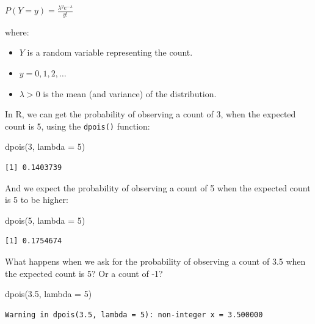 \documentclass[
  letterpaper,
  8pt,
  a4paper]{book}
\newenvironment{Shaded}{\begin{snugshade}}{\end{snugshade}}
\newcommand{\AttributeTok}[1]{\textcolor[rgb]{0.40,0.45,0.13}{#1}}
\newcommand{\DecValTok}[1]{\textcolor[rgb]{0.68,0.00,0.00}{#1}}
\newcommand{\FloatTok}[1]{\textcolor[rgb]{0.68,0.00,0.00}{#1}}
\newcommand{\FunctionTok}[1]{\textcolor[rgb]{0.28,0.35,0.67}{#1}}
\newcommand{\NormalTok}[1]{\textcolor[rgb]{0.00,0.23,0.31}{#1}}
\providecommand{\tightlist}{%
  \setlength{\itemsep}{0pt}\setlength{\parskip}{0pt}}
\begin{document}
\(P(Y = y) = \frac{\lambda^y e^{-\lambda}}{y!}\)

where:

\begin{itemize}
\tightlist
\item
  \(Y\) is a random variable representing the count.
\item
  \(y = 0, 1, 2, \ldots\)
\item
  \(\lambda > 0\) is the mean (and variance) of the distribution.
\end{itemize}

In R, we can get the probability of observing a count of 3, when the
expected count is 5, using the \texttt{dpois()} function:

\begin{Shaded}
\begin{Highlighting}[]
\FunctionTok{dpois}\NormalTok{(}\DecValTok{3}\NormalTok{, }\AttributeTok{lambda =} \DecValTok{5}\NormalTok{)}
\end{Highlighting}
\end{Shaded}

\begin{verbatim}
[1] 0.1403739
\end{verbatim}

And we expect the probability of observing a count of 5 when the
expected count is 5 to be higher:

\begin{Shaded}
\begin{Highlighting}[]
\FunctionTok{dpois}\NormalTok{(}\DecValTok{5}\NormalTok{, }\AttributeTok{lambda =} \DecValTok{5}\NormalTok{)}
\end{Highlighting}
\end{Shaded}

\begin{verbatim}
[1] 0.1754674
\end{verbatim}

What happens when we ask for the probability of observing a count of 3.5
when the expected count is 5? Or a count of -1?

\begin{Shaded}
\begin{Highlighting}[]
\FunctionTok{dpois}\NormalTok{(}\FloatTok{3.5}\NormalTok{, }\AttributeTok{lambda =} \DecValTok{5}\NormalTok{)}
\end{Highlighting}
\end{Shaded}

\begin{verbatim}
Warning in dpois(3.5, lambda = 5): non-integer x = 3.500000
\end{verbatim}
\end{document}
